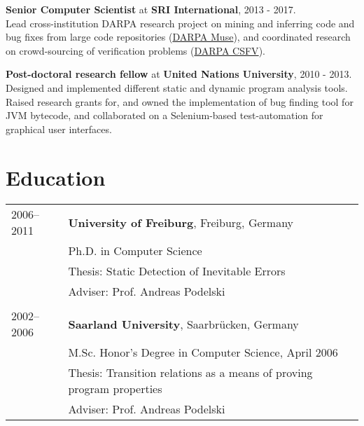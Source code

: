 \documentclass[margin,line]{res}
\begin{document}
\begin{resume}
\textbf{Senior Computer Scientist} at \textbf{SRI International}, 2013 - 2017.\\
Lead cross-institution DARPA research project on mining and inferring code and bug fixes from large code repositories
 (\href{https://www.darpa.mil/program/mining-and-understanding-software-enclaves}{DARPA Muse}), 
and coordinated research on crowd-sourcing of verification problems (\href{https://www.darpa.mil/program/crowd-sourced-formal-verification}{DARPA CSFV}).


\textbf{Post-doctoral research fellow} at \textbf{United Nations University}, 2010 - 2013.\\
Designed and implemented different static and dynamic program analysis tools.
Raised research grants for, and owned the implementation of bug finding tool for JVM bytecode, and 
collaborated on a Selenium-based test-automation for graphical user interfaces. 

\bigskip
\section{\sc Education}

\begin{tabular}{@{}ll@{}}
2006--2011 & {\bf University of Freiburg}, Freiburg, Germany\\
& Ph.D. in Computer Science\\
& Thesis: Static Detection of Inevitable Errors\\
& Adviser: Prof. Andreas Podelski \\
\\
2002--2006 & {\bf Saarland University}, Saarbr\" ucken, Germany\\
& M.Sc. Honor's Degree in Computer Science, April 2006\\
& Thesis: Transition relations as a means of proving program properties\\
& Adviser: Prof. Andreas Podelski
\end{tabular}

\newpage

\bigskip

\bigskip

\bigskip
\newpage

\bigskip

\bigskip
%



\end{resume}
\end{document}
